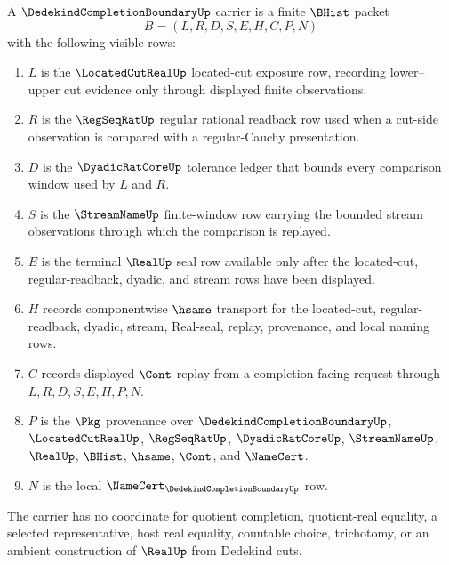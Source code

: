 \begin{definition}
\label{def:dedekind-completion-boundary-carrier}
A $\DedekindCompletionBoundaryUp$ carrier is a finite $\BHist$ packet
$$
B=(L,R,D,S,E,H,C,P,N)
$$
with the following visible rows:
\begin{enumerate}
\item $L$ is the $\LocatedCutRealUp$ located-cut exposure row, recording lower--upper cut evidence only through displayed finite observations.
\item $R$ is the $\RegSeqRatUp$ regular rational readback row used when a cut-side observation is compared with a regular-Cauchy presentation.
\item $D$ is the $\DyadicRatCoreUp$ tolerance ledger that bounds every comparison window used by $L$ and $R$.
\item $S$ is the $\StreamNameUp$ finite-window row carrying the bounded stream observations through which the comparison is replayed.
\item $E$ is the terminal $\RealUp$ seal row available only after the located-cut, regular-readback, dyadic, and stream rows have been displayed.
\item $H$ records componentwise $\hsame$ transport for the located-cut, regular-readback, dyadic, stream, Real-seal, replay, provenance, and local naming rows.
\item $C$ records displayed $\Cont$ replay from a completion-facing request through $L,R,D,S,E,H,P,N$.
\item $P$ is the $\Pkg$ provenance over $\DedekindCompletionBoundaryUp$, $\LocatedCutRealUp$, $\RegSeqRatUp$, $\DyadicRatCoreUp$, $\StreamNameUp$, $\RealUp$, $\BHist$, $\hsame$, $\Cont$, and $\NameCert$.
\item $N$ is the local $\NameCert_{\DedekindCompletionBoundaryUp}$ row.
\end{enumerate}
The carrier has no coordinate for quotient completion, quotient-real equality, a selected representative, host real equality, countable choice, trichotomy, or an ambient construction of $\RealUp$ from Dedekind cuts.
\end{definition}

